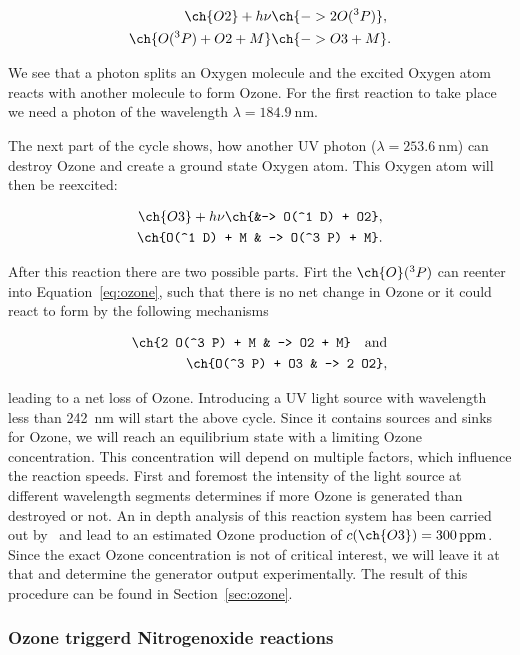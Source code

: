 \begin{align}
  \ch{O2} + h\nu &\ch{-> 2 O(^3P)},\nonumber\\
  \ch{O(^3 P) + O2 + M} &\ch{-> O3 + M}. \label{eq:ozone}
\end{align}

We see that a photon splits an Oxygen molecule and the excited
Oxygen atom reacts with another  molecule to form Ozone. For
the first reaction to take place we need a photon of the wavelength
$\lambda = \SI{184.9}{\nano\meter}$.

The next part of the cycle shows, how another UV photon ($\lambda =
\SI{253.6}{\nano\meter}$) can destroy
Ozone and create a ground state Oxygen atom. This Oxygen atom will
then be reexcited:

\begin{align}
  \ch{O3} + h\nu \ch{&-> O(^1 D) +
  O2}, \label{eq:split}\\
  \ch{O(^1 D) + M & -> O(^3 P) + M}.\nonumber
\end{align}

After this reaction there are two possible parts. Firt the $\ch{O}(^3
P)$ can reenter into Equation~\eqref{eq:ozone}, such that there is no
net change in Ozone or it could react to form  by the
following mechanisms

\begin{align*}
  \ch{2 O(^3 P) + M & -> O2 + M} \quad \text{and}\\
  \ch{O(^3 P) + O3 & -> 2 O2},
\end{align*}

leading to a net loss of Ozone. Introducing a UV light source with
wavelength less than \SI{242}{\nano\meter} will start the above
cycle. Since it contains sources and sinks for Ozone, we will reach an
equilibrium state with a limiting Ozone concentration. This
concentration will depend on multiple factors, which influence the
reaction speeds. First and foremost the intensity of the light source
at different wavelength segments determines if more Ozone is generated
than destroyed or not. An in depth analysis of this reaction system
has been carried out by~\cite{bsc} and lead to an estimated Ozone
production of $c(\ch{O3}) = \SI{300}{ppm}$. Since the exact Ozone
concentration is not of critical interest, we will leave it at that
and determine the generator output experimentally. The result of this
procedure can be found in Section~\ref{sec:ozone}. 

\subsubsection{Ozone triggerd Nitrogenoxide reactions}
\label{sec:o-no}

